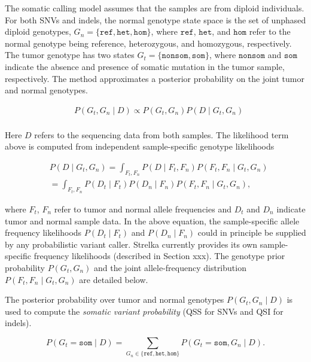 \documentclass{article}
\begin{document}
The somatic calling model assumes that the samples are from diploid individuals. For both SNVs and indels, the normal genotype state space is the set of unphased diploid genotypes, $G_n = \{ \texttt{ref}, \texttt{het}, \texttt{hom}\}$, where $\texttt{ref}$, $\texttt{het}$, and $\texttt{hom}$ refer to the normal genotype being reference, heterozygous, and homozygous, respectively. The tumor genotype has two states $G_t = \{ \texttt{nonsom}, \texttt{som} \}$, where $\texttt{nonsom}$ and $\texttt{som}$ indicate the absence and presence of somatic mutation in the tumor sample, respectively. The method approximates a posterior probability on the joint tumor and normal genotypes.

\begin{align*}
	& P(G_t,G_n \mid D) \propto P(G_t,G_n) P(D \mid G_t,G_n) \\
\end{align*}


Here $D$ refers to the sequencing data from both samples. The likelihood term above is computed from independent sample-specific genotype likelihoods

\begin{align*}
	& P(D \mid G_t,G_n) = \int_{F_t,F_n}{P(D \mid F_t,F_n)P(F_t,F_n \mid G_t,G_n)} \\
	& = \int_{F_t,F_n}{P(D_t \mid F_t)P(D_n \mid F_n)P(F_t,F_n \mid G_t,G_n)},
\end{align*}

\noindent where $F_t$, $F_n$ refer to tumor and normal allele frequencies and $D_t$ and $D_n$ indicate tumor and normal sample data. In the above equation, the sample-specific allele frequency likelihoods $P(D_t \mid F_t)$ and $P(D_n \mid F_n)$ could in principle be supplied by any probabilistic variant caller. Strelka currently provides its own sample-specific frequency likelihoods (described in Section xxx). The genotype prior probability $P(G_t, G_n)$ and the joint allele-frequency distribution $P(F_t,F_n \mid G_t,G_n)$ are detailed below.

The posterior probability over tumor and normal genotypes $P(G_t,G_n \mid D)$ is used to compute the {\em somatic variant probability} (QSS for SNVs and QSI for indels).

\begin{equation}
\label{eqn:somVarProb}
	P(G_t = \texttt{som} \mid D) = \sum_{G_n \in \{ \texttt{ref}, \texttt{het}, \texttt{hom} \}}{P(G_t=\texttt{som},G_n \mid D)}.
\end{equation}
\end{document}
